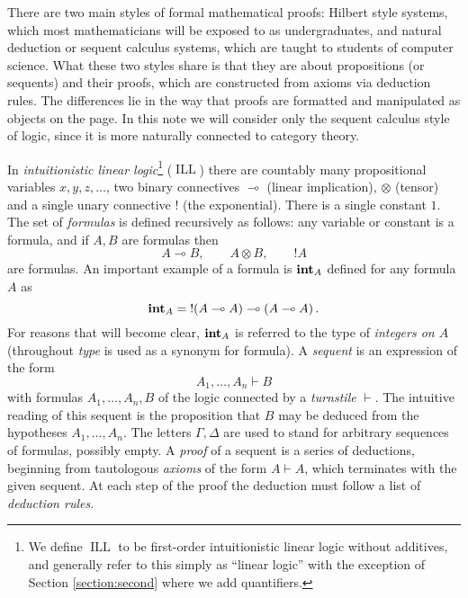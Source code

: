 \documentclass[english,letter paper,12pt,reqno]{article}
\theoremstyle{example}
\DeclareMathOperator{\ILL}{ILL}
\def\inta{\bold{int}}
\begin{document}

There are two main styles of formal mathematical proofs: Hilbert style systems, which most mathematicians will be exposed to as undergraduates, and natural deduction or sequent calculus systems, which are taught to students of computer science. What these two styles share is that they are about propositions (or sequents) and their proofs, which are constructed from axioms via deduction rules. The differences lie in the way that proofs are formatted and manipulated as objects on the page. In this note we will consider only the sequent calculus style of logic, since it is more naturally connected to category theory.

In \emph{intuitionistic linear logic}\footnote{We define $\ILL$ to be first-order intuitionistic linear logic without additives, and generally refer to this simply as ``linear logic'' with the exception of Section \ref{section:second} where we add quantifiers.} ($\ILL$) there are countably many propositional variables $x,y,z,\ldots$, two binary connectives $\multimap$ (linear implication), $\otimes$ (tensor) and a single unary connective $!$ (the exponential). There is a single constant $1$. The set of \emph{formulas} is defined recursively as follows: any variable or constant is a formula, and if $A,B$ are formulas then
\[
A \multimap B, \qquad A \otimes B, \qquad {!}A
\]
are formulas. An important example of a formula is $\inta_A$ defined for any formula $A$ as
\begin{equation}\label{defn:integers} 
\inta_A = {!}( A \multimap A) \multimap (A \multimap A)\,.
\end{equation}
For reasons that will become clear, $\inta_A$ is referred to the type of \emph{integers on $A$} (throughout \emph{type} is used as a synonym for formula). A \emph{sequent} is an expression of the form
\[
A_1,\ldots,A_n \vdash B
\]
with formulas $A_1,\ldots,A_n, B$ of the logic connected by a \emph{turnstile} $\vdash$. The intuitive reading of this sequent is the proposition that $B$ may be deduced from the hypotheses $A_1,\ldots,A_n$. The letters $\Gamma, \Delta$ are used to stand for arbitrary sequences of formulas, possibly empty. A \emph{proof} of a sequent is a series of deductions, beginning from tautologous \emph{axioms} of the form $A \vdash A$, which terminates with the given sequent. At each step of the proof the deduction must follow a list of \emph{deduction rules}. 
\end{document}
